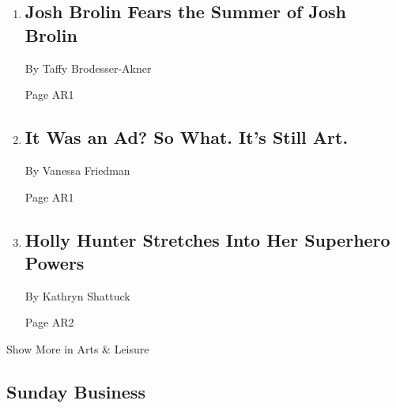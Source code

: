 \begin{enumerate}
\def\labelenumi{\arabic{enumi}.}
\item
  \href{/2018/06/20/movies/josh-brolin-avengers-deadpool-sicario.html}{}

  \hypertarget{josh-brolin-fears-the-summer-of-josh-brolin}{%
  \subsection{Josh Brolin Fears the Summer of Josh
  Brolin}\label{josh-brolin-fears-the-summer-of-josh-brolin}}

  By Taffy Brodesser-Akner

  Page AR1
\item
  \href{/2018/06/22/arts/design/getty-museum-icons-of-style.html}{}

  \hypertarget{it-was-an-ad-so-what-its-still-art}{%
  \subsection{It Was an Ad? So What. It's Still
  Art.}\label{it-was-an-ad-so-what-its-still-art}}

  By Vanessa Friedman

  Page AR1
\item
  \href{/2018/06/19/movies/holly-hunter-incredibles-2.html}{}

  \hypertarget{holly-hunter-stretches-into-her-superhero-powers}{%
  \subsection{Holly Hunter Stretches Into Her Superhero
  Powers}\label{holly-hunter-stretches-into-her-superhero-powers}}

  By Kathryn Shattuck

  Page AR2
\end{enumerate}

Show More in Arts \& Leisure

\hypertarget{sunday-business}{%
\subsection{Sunday Business}\label{sunday-business}}

